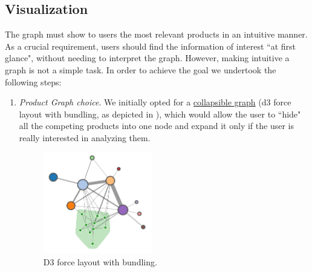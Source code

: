\documentclass[a4paper,12pt]{article}
\begin{document}
\subsection{Visualization}
The graph must show to users the most relevant products in an intuitive manner. As a crucial requirement, users should find the information of interest ``at first glance", without needing to interpret the graph. However, making intuitive a graph is not a simple task. In order to achieve the goal we undertook the following steps:
\begin{enumerate}
	\item \textit{Product Graph choice}. We initially opted for a \href{http://bl.ocks.org/GerHobbelt/3071239}{collapsible graph} (d3 force layout with bundling, as depicted in ), which would allow the user to ``hide" all the competing products into one node and expand it only if the user is really interested in analyzing them.
\begin{figure}[H]
	\centering{}
	\includegraphics[width=0.45\textwidth]{img/collapsible_graph.png}
	\caption{D3 force layout with bundling.}
	\label{fig:collapsible_graph}
\end{figure}

\end{enumerate}
\end{document}
